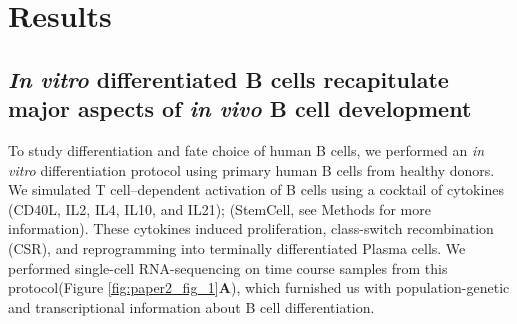 \section{Results}

\subsection{\textit{In vitro} differentiated B cells recapitulate major aspects of \textit{in vivo} B cell development}

To study differentiation and fate choice of human B cells, we performed an \textit{in vitro} differentiation protocol using primary human B cells from healthy donors. We simulated T cell–dependent activation of B cells using a cocktail of cytokines (CD40L, IL2, IL4, IL10, and IL21); (StemCell, see Methods for more information). These cytokines induced proliferation, class-switch recombination (CSR), and reprogramming into terminally differentiated Plasma cells. We performed single-cell RNA-sequencing on time course samples from this protocol(Figure \ref{fig:paper2_fig_1}\textbf{A}), which furnished us with population-genetic and transcriptional information about B cell differentiation. 
